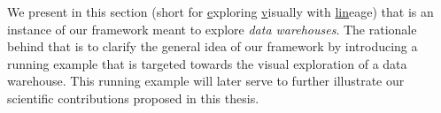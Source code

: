 






We present in this section \prototype{} (short for \underline{e}xploring \underline{v}isually with \underline{lin}eage) that is an instance of our framework \framework{} meant to explore \emph{data warehouses}. The rationale behind that is to clarify the general idea of our framework \framework{} by introducing a running example that is targeted towards the visual exploration of a data warehouse.
This running example will later serve to further illustrate our scientific contributions proposed in this thesis.





